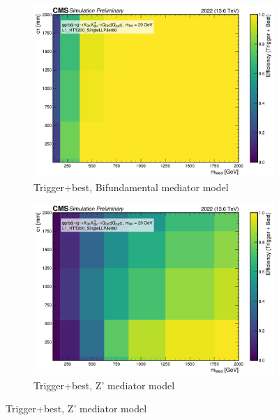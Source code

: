 \begin{figure}[h]
  \vspace{1em}

  \begin{subfigure}[t]{0.45\textwidth}
    \centering
    \includegraphics[width=\linewidth]{images/L1/llp_2D_tchan/trigeffplots2D_L1_efftype-trigplusbest_t-channel_mDark-20_L1_HTT200_SingleLLPJet60_study_cloppear.pdf}
    \caption{Trigger+best, Bifundamental mediator model}
    \label{fig:htt200singlellpjet60_trigplusbest_tchan}
  \end{subfigure}
  \hfill
  \begin{subfigure}[t]{0.45\textwidth}
    \centering
    \includegraphics[width=\linewidth]{images/L1/llp_2D_schan/trigeffplots2D_L1_efftype-trigplusbest_s-channel_mDark-20_L1_HTT200_SingleLLPJet60_study_cloppear.pdf}
    \caption{Trigger+best, Z' mediator model}
    \label{fig:htt200singlellpjet60_trigplusbest_schan}
  \end{subfigure}


\end{figure}
